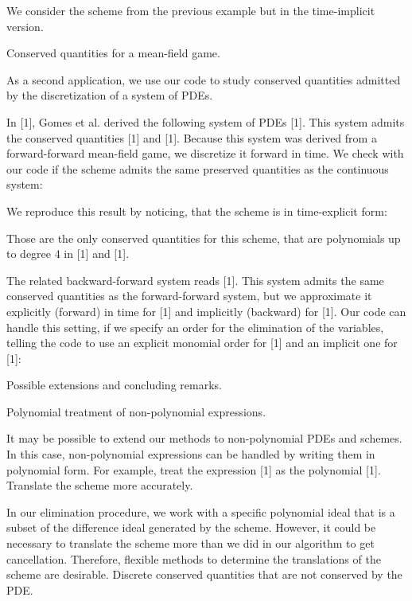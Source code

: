\documentclass{article}
\begin{document}
	We consider the scheme from the previous example but in the time-implicit version.
	
	
		
		
	

Conserved quantities for a mean-field game.


As a second application, we use our code to study conserved quantities admitted by the discretization of a system of PDEs.

	In [1], Gomes et al. derived the following system of PDEs
	[1].
	This system admits the conserved quantities [1] and [1].
	Because this system was derived from a forward-forward mean-field game, we discretize it forward in time. We check with our code if the scheme admits the same preserved quantities as the continuous system:
	
	
		
		
	
	We reproduce this result by noticing, that the scheme is in time-explicit form:
	
	
		
		
	
	Those are the only conserved quantities for this scheme, that are polynomials up to degree 4 in [1] and [1].
	
	
		
		
	


	The related backward-forward system reads
	[1].
	This system admits the same conserved quantities as the forward-forward system, but we approximate it explicitly (forward) in time for [1] and implicitly (backward) for [1]. Our code can handle this setting, if we specify an order for the elimination of the variables, telling the code to use an explicit monomial order for [1] and an implicit one for [1]:
	
	
		
		
	

Possible extensions and concluding remarks.


Polynomial treatment of non-polynomial expressions.


It may be possible to extend our methods to non-polynomial PDEs and schemes. In this case, non-polynomial expressions can be handled by writing them in polynomial form. For example, treat the expression [1]
as the polynomial [1].
Translate the scheme more accurately.


In our elimination procedure, we work with a specific polynomial ideal that is a subset of the difference ideal generated by the scheme. However, it could be necessary to translate the scheme more than we did in our algorithm to get cancellation. Therefore, flexible methods to determine the translations of the scheme are desirable.
Discrete conserved quantities that are not conserved by the PDE.
\end{document}
